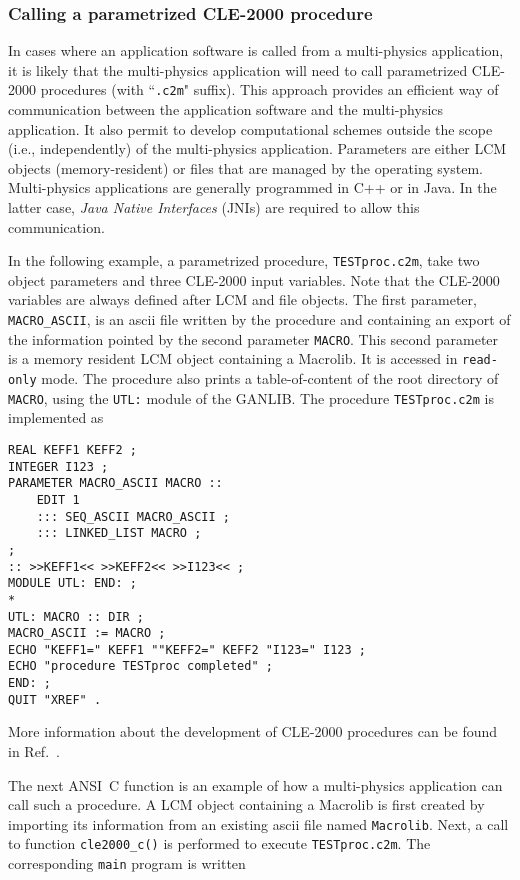 \subsubsection {Calling a parametrized CLE-2000 procedure}

In cases where an application software is called from a multi-physics application, it is likely that the multi-physics application
will need to call parametrized CLE-2000 procedures (with ``{\tt .c2m}" suffix). This approach provides an efficient way of communication between
the application software and the multi-physics application. It also permit to develop computational schemes outside the scope (i.e., independently)
of the multi-physics application. Parameters are either LCM objects (memory-resident) or
files that are managed by the operating system. Multi-physics applications are generally programmed
in C++ or in Java. In the latter case, {\sl Java Native Interfaces} (JNIs) are required to allow this communication.

\vskip 0.08cm

In the following example, a parametrized procedure, {\tt TESTproc.c2m}, take two object parameters and three CLE-2000 input variables.
Note that the CLE-2000 variables are always defined after LCM and file objects. The first parameter, {\tt MACRO\_ASCII}, is
an {\sc ascii} file written by the procedure and containing an export of the information pointed by the second parameter {\tt MACRO}. This second parameter is a
memory resident LCM object containing a Macrolib. It is accessed in {\tt read-only} mode. The procedure also prints a table-of-content
of the root directory of {\tt MACRO}, using the {\tt UTL:} module of the GANLIB. The procedure {\tt TESTproc.c2m} is implemented as
\begin{verbatim}
REAL KEFF1 KEFF2 ;
INTEGER I123 ;
PARAMETER MACRO_ASCII MACRO ::
    EDIT 1
    ::: SEQ_ASCII MACRO_ASCII ;
    ::: LINKED_LIST MACRO ;
;
:: >>KEFF1<< >>KEFF2<< >>I123<< ;
MODULE UTL: END: ;
*
UTL: MACRO :: DIR ;
MACRO_ASCII := MACRO ;
ECHO "KEFF1=" KEFF1 ""KEFF2=" KEFF2 "I123=" I123 ;
ECHO "procedure TESTproc completed" ;
END: ;
QUIT "XREF" .
\end{verbatim}

\noindent More information about the development of CLE-2000 procedures can be found in Ref.~.

\vskip 0.08cm

The next ANSI~C function is an example of how a multi-physics application can call such a procedure. A LCM object
containing a Macrolib is first created by importing its information from an existing {\sc ascii} file named {\tt Macrolib}. Next, a call to function
{\tt cle2000\_c()} is performed to execute {\tt TESTproc.c2m}. The corresponding {\tt main} program is written
\goodbreak

